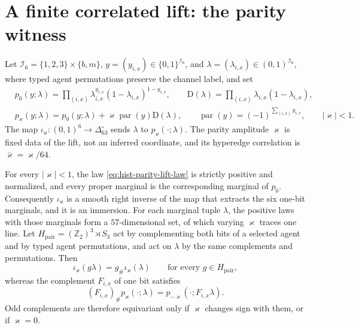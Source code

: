 \section{A finite correlated lift: the parity witness}
\label{sec:hist-finite-parity-lift}

Let $\mathcal I_6=\{1,2,3\}\times\{b,m\}$, $y=(y_{i,x})\in\{0,1\}^{\mathcal I_6}$, and
$\lambda=(\lambda_{i,x})\in(0,1)^{\mathcal I_6}$, where typed agent permutations preserve
the channel label, and set
\begin{align}
&p_0(y;\lambda)
=\prod_{(i,x)}\lambda_{i,x}^{y_{i,x}}(1-\lambda_{i,x})^{1-y_{i,x}},
\qquad
\mathrm D(\lambda)=\prod_{(i,x)}\lambda_{i,x}(1-\lambda_{i,x}),
\label{eq:hist-parity-product-and-amplitude}\\
&p_\varkappa(y;\lambda)=p_0(y;\lambda)+\varkappa\operatorname{par}(y)\mathrm D(\lambda),
\qquad
\operatorname{par}(y)=(-1)^{\sum_{(i,x)}y_{i,x}},
\qquad|\varkappa|<1.
\label{eq:hist-parity-lift-law}
\end{align}
The map $\iota_\varkappa:(0,1)^6\to\Delta^\circ_{63}$ sends $\lambda$ to
$p_\varkappa(\cdot;\lambda)$.  The parity amplitude $\varkappa$ is fixed data of the
lift, not an inferred coordinate, and its hyperedge correlation is
$\bar\varkappa=\varkappa/64$.

For every $|\varkappa|<1$, the law \eqref{eq:hist-parity-lift-law} is strictly positive
and normalized, and every proper marginal is the corresponding marginal of $p_0$.
Consequently $\iota_\varkappa$ is a smooth right inverse of the map that extracts the six
one-bit marginals, and it is an immersion.  For each marginal tuple $\lambda$, the
positive laws with those marginals form a $57$-dimensional set, of which varying
$\varkappa$ traces one line.  Let $H_{\mathrm{pair}}=(\mathbb Z_2)^3\rtimes S_3$ act by
complementing both bits of a selected agent and by typed agent permutations, and act on
$\lambda$ by the same complements and permutations.  Then
\begin{equation}
\iota_\varkappa(g\lambda)=g_\#\iota_\varkappa(\lambda)
\qquad\text{for every }g\in H_{\mathrm{pair}},
\label{eq:hist-parity-paired-equivariance}
\end{equation}
whereas the complement $F_{i,x}$ of one bit satisfies
\begin{equation}
(F_{i,x})_\#p_\varkappa(\cdot;\lambda)=p_{-\varkappa}(\cdot;F_{i,x}\lambda).
\label{eq:hist-parity-odd-pseudoscalar}
\end{equation}
Odd complements are therefore equivariant only if $\varkappa$ changes sign with them, or
if $\varkappa=0$.  


